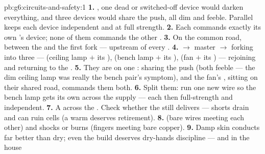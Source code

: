 \begin{solution}{pb:g6:circuits-and-safety:1}
\textbf{1.} , one dead or switched-off device would
darken everything, and three devices would share the push, all
dim and feeble. Parallel keeps each device independent and at
full strength.
\textbf{2.} Each  commands exactly its own 's device;
none of them commands the other .
\textbf{3.} On the common road, between the  and the first
fork --- upstream of every .
\textbf{4.}  $\to$ master  $\to$  forking
into three  --- (ceiling lamp $+$ its ), (bench
lamp $+$ its ), (fan  $+$ its ) --- rejoining
and returning to the .
\textbf{5.} They are  on one : sharing the push
(both feeble --- the dim ceiling lamp was really the bench pair's
symptom), and the fan's , sitting on their shared road,
commands them both.
\textbf{6.} Split them: run one new wire so the bench lamp gets
its own  across the supply --- each then full-strength and
independent.
\textbf{7.} A  across the . Check whether
the  still delivers --- shorts drain and can ruin cells
(a warm  deserves retirement).
\textbf{8.}  (bare wires meeting each other) and
shocks or burns (fingers meeting bare copper).
\textbf{9.} Damp skin conducts far better than dry; even the
 build deserves dry-hands discipline --- and in the house

\end{solution}
